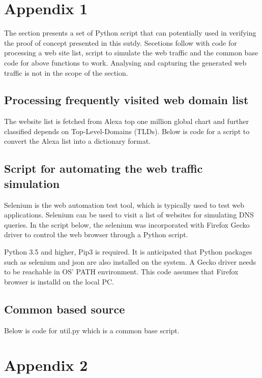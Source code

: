 \documentclass[a4paper,12pt]{article}
\begin{document}
\section{Appendix 1}\label{scriptcode-appendix}
The section presents a set of Python script that can potentially used in verifying the proof of concept presented in this sutdy.
Secetions follow with code for processing a web site list, script to simulate the web traffic and the common base code for above functions to work.
Analysing and capturing the generated web traffic is not in the scope of the section.

\subsection{Processing frequently visited web domain list} \label{processweblist}
The website list is fetched from Alexa top one million global chart and further classified depends on Top-Level-Domains (TLDs).
Below is code for a script to convert the Alexa list into a dictionary format.

\subsection{Script for automating the web traffic simulation}
Selenium is the web automation test tool\cite{holmes2006automating}, which is typically used to test web applications. Selenium can be used to visit a list of websites for simulating DNS queries. In the script below, the selenium was incorporated with Firefox Gecko driver to control the web browser through a Python script.

Python 3.5 and higher, Pip3 is required. It is anticipated that Python packages such as selenium and json are also installed on the system. A Gecko driver needs to be reachable in OS' PATH environment. This code assumes that Firefox browser is installd on the local PC.

\subsection{Common based source}
Below is code for util.py which is a common base script.
\newpage

\section{Appendix 2}\label{protocol-verification}

\end{document}
